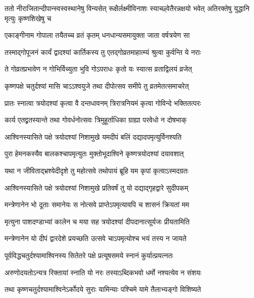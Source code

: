 \threelineshloka
{ततो नीराजितान्दीपान्स्वस्वस्थानेषु विन्यसेत्}
{रूक्षैर्लक्ष्मीविनाशः स्याच्छ्वेतैरन्नक्षयो भवेत्}
{अतिरक्तेषु युद्धानि मृत्युः कृष्णशिखेषु च} %

\twolineshloka
{एकाङ्गीनाम गोपाला तयैतच्च व्रतं कृतम्}
{धनधान्यसमायुक्ता जाता वर्षत्रयेण सा} %

\twolineshloka
{तस्माद्गोपूजनं कार्यं द्वादश्यां कार्तिकस्य तु}
{एतद्गोव्रतमाहात्म्यं श्रुत्वा कुर्वन्ति ये नराः} %

\twolineshloka
{ते गोव्रतप्रभावेण न गोभिर्विच्युता भुवि}
{गोऽपराधः कृतो यः स्यात्स व्रताद्विलयं व्रजेत्} %


\twolineshloka
{कृष्णपक्षे चतुर्दश्यां मासि चाऽऽश्वयुजे तथा}
{दीपोत्सव समीपे तु व्रतमेतत्समाचरेत्} %

\twolineshloka
{प्रातः स्नात्वा त्रयोदश्यां कृत्वा वै दन्तधावनम्}
{त्रिरात्रनियमं कृत्वा गोविन्दे भक्तितत्परः} %

\twolineshloka
{कार्य एतद्व्रतस्यान्ते तथा गोवर्धनोत्सवः}
{त्रिमुहूर्ताधिका ग्राह्या परवेधो न दोषभाक्} %

\twolineshloka
{आश्विनस्यासिते पक्षे त्रयोदश्यां निशामुखे}
{यमदीपं बलिं दद्यादपमृत्युर्विनश्यति} %

\twolineshloka
{पुरा हेमनकस्यैव बालकश्चापमृत्युतः}
{मुक्तोभूदाश्विने कृष्णत्रयोदश्यां दयावशात्} %

\twolineshloka
{यथा न जीविताद्भ्रश्येदीदृशे तु महोत्सवे}
{तथोपायं ब्रूहि यम कृपां कृत्वाऽस्मदग्रतः} %


\twolineshloka
{आश्विनस्यासिते पक्षे त्रयोदश्यां निशामुखे}
{प्रतिवर्षं तु यो दद्याद्गृहद्वारे सुदीपकम्} %

\twolineshloka
{मन्त्रेणानेन भो दूताः समानेयः स नोत्सवे}
{प्राप्तेऽपमृत्यावपि च शासनं क्रियतां मम} %

\twolineshloka
{मृत्युना पाशदण्डाभ्यां कालेन च मया सह}
{त्रयोदश्यां दीपदानात्सूर्यजः प्रीयतामिति} %

\twolineshloka
{मन्त्रेणानेन यो दीपं द्वारदेशे प्रयच्छति}
{उत्सवे चाऽपमृत्योश्च भयं तस्य न जायते} %


\twolineshloka
{पूर्वविद्धचतुर्दश्यामाश्विनस्य सितेतरे}
{पक्षे प्रत्यूषसमये स्नानं कुर्यात्प्रयत्नतः} %

\twolineshloka
{अरुणोदयतोऽन्यत्र रिक्तायां स्नाति यो नरः}
{तस्याऽब्दिकभवो धर्मो नश्यत्येव न संशयः} %

\twolineshloka
{तथा कृष्णचतुर्दश्यामाश्विनेऽर्कोदये सुराः}
{यामिन्याः पश्चिमे यामे तैलाभ्यङ्गो विशिष्यते} %

